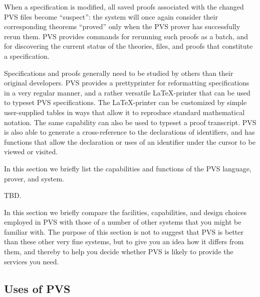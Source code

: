 {When a specification is modified, all saved proofs associated with
the changed PVS files become ``suspect'': the system will once again
consider their corresponding theorems ``proved'' only when the PVS
prover has successfully rerun them.  PVS provides commands for
rerunning such proofs as a batch, and for discovering the current
status of the theories, files, and proofs that constitute a
specification.

Specifications and proofs generally need to be studied by others than
their original developers.  PVS provides a prettyprinter for
reformatting specifications in a very regular manner, and a rather
versatile \LaTeX-printer that can be used to typeset PVS
specifications.  The \LaTeX-printer can be customized by simple
user-supplied tables in ways that allow it to reproduce standard
mathematical notation.  The same capability can also be used to
typeset a proof transcript.  PVS is also able to generate a
cross-reference to the declarations of identifiers, and has functions
that allow the declaration or uses of an identifier under the cursor
to be viewed or visited.


In this section we briefly list the capabilities and functions of the
PVS language, prover, and system.  

TBD.


In this section we briefly compare the facilities, capabilities, and
design choices employed in PVS with those of a number of other
systems that you might be familiar with.  The purpose of this section
is not to suggest that PVS is better than these other very fine
systems, but to give you an idea how it differs from them, and
thereby to help you decide whether PVS is likely to provide the
services you need.



}

\subsection{Uses of PVS}

